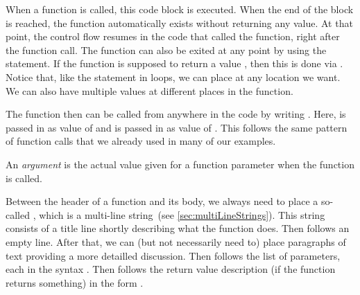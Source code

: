 When a function is called, this code block is executed.
When the end of the block is reached, the function automatically exists without returning any value.
At that point, the control flow resumes in the code that called the function, right after the function call.
The function can also be exited at any point by using the  statement.
If the function is supposed to return a value , then this is done via .
Notice that, like the  statement in loops, we can place  at any location we want.
We can also have multiple  values at different places in the function.%
%
\begin{sloppypar}%
The function  then can be called from anywhere in the code by writing .
Here,  is passed in as value of  and  is passed in as value of .
This follows the same pattern of function calls that we already used in many of our examples.%
\end{sloppypar}%
%
\begin{definition}[Argument]%
An \emph{argument} is the actual value given for a function parameter when the function is called.%
\end{definition}%
%
%
Between the header of a function and its body, we always need to place a so-called , which is a multi-line string~(see \cref{sec:multiLineStrings}).
This string consists of a title line shortly describing what the function does.
Then follows an empty line.
After that, we can (but not necessarily need to) place paragraphs of text providing a more detailled discussion.
Then follows the list of parameters, each in the syntax .
Then follows the return value description (if the function returns something) in the form .%
%
%
%
%
